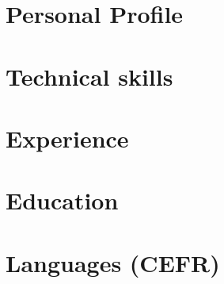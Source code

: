 \documentclass[11pt,a4paper,sans]{moderncv}
\begin{document}
\makecvtitle

\vspace*{-15mm}

\section{Personal Profile}


\section{Technical skills}


\section{Experience}


\section{Education}


\section{Languages (CEFR)}
 
\end{document}
